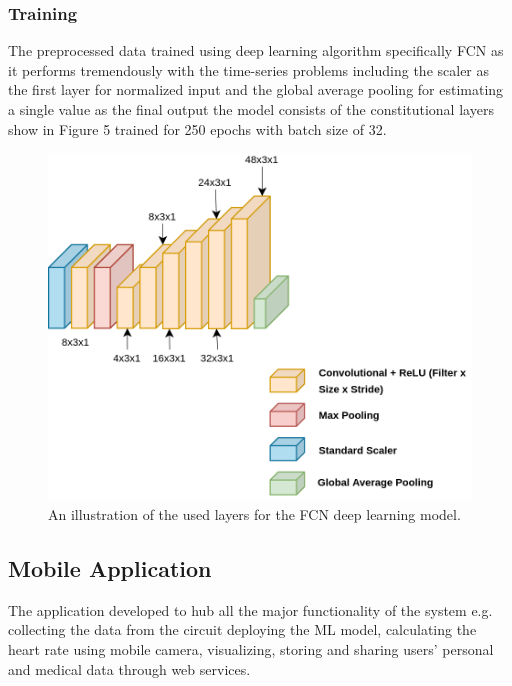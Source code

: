\documentclass{bmcart}
\begin{document}
\subsubsection*{Training}
The preprocessed data trained using deep learning algorithm specifically FCN as
it performs tremendously with the time-series problems including the scaler as
the first layer for normalized input and the global average pooling for
estimating a single value as the final output the model consists of the
constitutional layers show in Figure 5 trained for 250 epochs with batch size of
32.
\begin{figure}[h!]
  \includegraphics[width=.9\linewidth]{png_images/spo2_model.png}
  \caption{
  An illustration of the used layers for the FCN deep learning model.}
\end{figure}
\FloatBarrier


\subsection*{Mobile Application}
The application developed to hub all the major functionality of the system e.g.
collecting the data from the circuit deploying the ML model, calculating the
heart rate using mobile camera, visualizing, storing and sharing users' personal
and medical data through web services.
\end{document}
